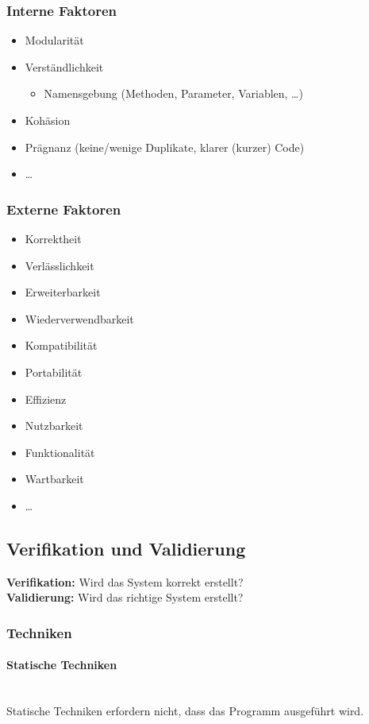 \documentclass[ngerman]{tuda_summary}
\begin{document}
\subsubsection{Interne Faktoren}
\begin{itemize}
    \item Modularität
    \item Verständlichkeit
          \begin{itemize}
              \item Namensgebung (Methoden, Parameter, Variablen, \dots)
          \end{itemize}
    \item Kohäsion
    \item Prägnanz (keine/wenige Duplikate, klarer (kurzer) Code)
    \item \dots
\end{itemize}

\subsubsection{Externe Faktoren}
\begin{itemize}
    \item Korrektheit
    \item Verlässlichkeit
    \item Erweiterbarkeit
    \item Wiederverwendbarkeit
    \item Kompatibilität
    \item Portabilität
    \item Effizienz
    \item Nutzbarkeit
    \item Funktionalität
    \item Wartbarkeit
    \item \dots
\end{itemize}

\subsection{Verifikation und Validierung}
\textbf{Verifikation:} Wird das System korrekt erstellt? \\
\textbf{Validierung:} Wird das richtige System erstellt?

\subsubsection{Techniken}
\paragraph{Statische Techniken}\mbox{}\\
Statische Techniken erfordern nicht, dass das Programm ausgeführt wird.
\end{document}
